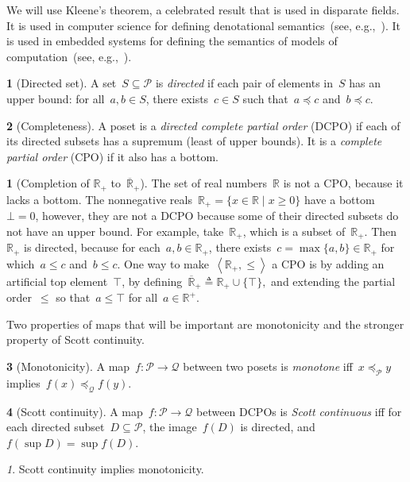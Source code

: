 \documentclass[twocolumn,english]{IEEEtran}
\theoremstyle{definition}
\newtheorem{defn}{\protect\definitionname}
\theoremstyle{plain}
\theoremstyle{definition}
\newtheorem{example}{\protect\examplename}
\theoremstyle{remark}
\newtheorem{rem}{\protect\remarkname}
\theoremstyle{definition}
\theoremstyle{plain}
\theoremstyle{plain}
\newcommand{\reals}{\mathbb{R}}
\newcommand{\nonNegReals}{\reals^{+}_{\bullet}}
\newcommand{\posleq}{\preceq}
\newcommand{\posA}{\mathcal{P}}
\newcommand{\posAleq}{\mathrel{{\posleq_\posA}}}
\newcommand{\posB}{\mathcal{Q}}
\newcommand{\posBleq}{\mathrel{{\posleq_\posB}}}
\newcommand{\CPO}{\textsc{CPO}\xspace}
\newcommand{\DCPO}{\textsc{DCPO}\xspace}
\newcommand{\scottcontinuous}{Scott continuous\xspace}
\newcommand{\scottcontinuity}{Scott continuity\xspace}
\renewcommand{\nonNegReals}{\mathbb{R}_+}
\newcommand{\nonNegRealsComp}{\overline{\mathbb{R}}_+}
\providecommand{\definitionname}{Definition}
\providecommand{\examplename}{Example}
\providecommand{\remarkname}{Remark}
\begin{document}
We will use Kleene's theorem, a celebrated result that is used in
disparate fields. It is used in computer science for defining denotational
semantics~(see, e.g.,~\cite{manes86}). It is used in embedded systems
for defining the semantics of models of computation~(see, e.g.,~\cite{lee10}).

\begin{defn}[Directed set]
A set~$S\subseteq\posA$ is \emph{directed} if each pair of elements
in~$S$ has an upper bound: for all~$a,b\in S$, there exists~$c\in S$
such that~$a\posleq c$ and~$b\posleq c$. 
\end{defn}

\begin{defn}[Completeness]
\label{def:cpo}A poset is a \emph{directed complete partial order}
(\DCPO) if each of its directed subsets has a supremum (least of
upper bounds). It is a \emph{complete partial order} (\CPO) if it
also has a bottom.

\end{defn}
\begin{example}[Completion of $\nonNegReals$ to~$\nonNegRealsComp$]
\label{exa:Rcomp}The set of real numbers~$\mathbb{R}$ is not
a \CPO, because it lacks a bottom. The nonnegative reals~$\nonNegReals=\{x\in\reals\mid x\geq0\}$
have a bottom~$\bot=0$, however, they are not a \DCPO because some
of their directed subsets do not have an upper bound. For example,
take~$\nonNegReals$, which is a subset of~$\nonNegReals$. Then~$\nonNegReals$
is directed, because for each~$a,b\in\nonNegReals$, there exists~$c=\max\{a,b\}\in\nonNegReals$
for which~$a\leq c$ and~$b\leq c$. One way to make~$\left\langle \nonNegReals,\leq\right\rangle $
a \CPO is by adding an artificial top element~$\top$, by defining~$\nonNegRealsComp\triangleq\nonNegReals\cup\{\top\},$
and extending the partial order~$\leq$ so that~$a\leq\top$ for
all~$a\in\reals^{+}$. 
\end{example}

Two properties of maps that will be important are monotonicity and
the stronger property of \scottcontinuity.
\begin{defn}[Monotonicity]
\label{def:monotone}A map~$f\colon\posA\rightarrow\posB$ between
two posets is \emph{monotone} iff~$x\posAleq y$ implies~$f(x)\posBleq f(y)$. 
\end{defn}

\begin{defn}[\scottcontinuity]
\label{def:scott}A map~$f:\posA\rightarrow\posB$ between DCPOs
is\textbf{ }\emph{\scottcontinuous{}}\textbf{ }iff for each directed
subset~$D\subseteq\posA$, the image~$f(D)$ is directed, and $f(\sup D)=\sup f(D).$
\end{defn}
\begin{rem}
\scottcontinuity implies monotonicity.
\end{rem}
\end{document}
